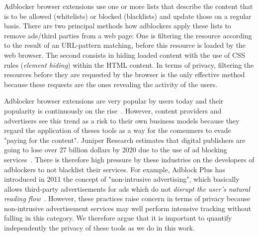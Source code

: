 \documentclass[compsoc, conference, letterpaper, 10pt, times]{IEEEtran}
\begin{document}
Adblocker browser extensions use one or more lists that describe the content that is to be allowed (whitelists) or blocked (blacklists) and update those on a regular basis. There are two principal methods how adblockers apply these lists to remove ads/third parties from a web page: One is filtering the resource according to the result of an URL-pattern matching, before this resource is loaded by the web browser. The second consists in hiding loaded content with the use of CSS rules (\textit{element hiding}) within the HTML content. In terms of privacy, filtering the resources before they are requested by the browser is the only effective method because these requests are the ones revealing the activity of the users. 

Adblocker browser extensions are very popular by users today and their popularity is continuously on the rise~\cite{Mozilla_statistics,Google_statistics,pujol}. However, content providers and advertisers see this trend as a risk to their own business models because they regard the application of theses tools as a way for the comsumers to evade "paying for the content". Juniper Research estimates that digital publishers are going to lose over 27 billion dollars by 2020 due to the use of ad blocking services~\cite{Juniper_study}. There is therefore high pressure by these industries on the developers of adblockers to not blacklist their services. For example, Adblock Plus has introduced in 2011 the concept of "non-intrusive advertising", which basically allows third-party advertisements for ads which do not \emph{disrupt the user's natural reading flow}~\cite{acceptable_ads}. However, these practices raise concern in terms of privacy because non-intrusive advertisement services may well perform intensive tracking without falling in this category.  We therefore argue that it is important to quantify independently the privacy of these tools as we do in this work. 






\end{document}
